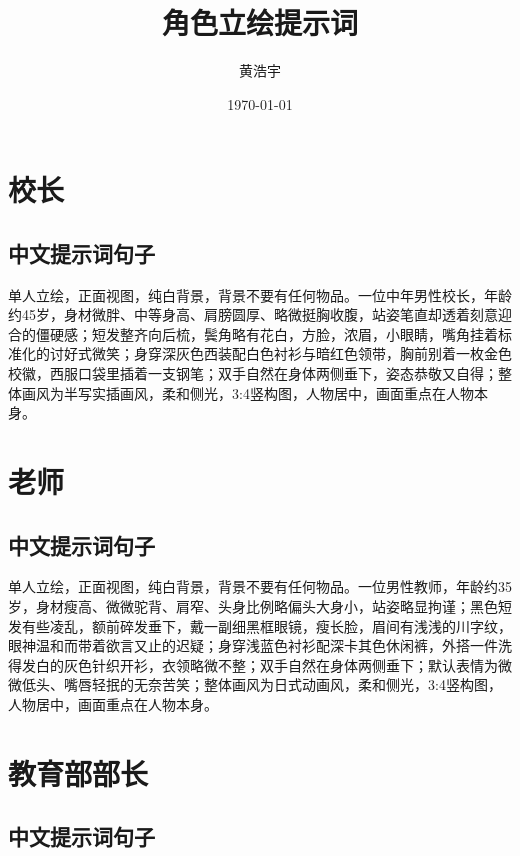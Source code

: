 \documentclass[11pt, a4paper]{article}
\title{角色立绘提示词}
\author{黄浩宇}
\date{\today}
\begin{document}
	
	\maketitle
	\newpage
	
	\tableofcontents
	\newpage
	
	\section{校长}
	
	\subsection{中文提示词句子}
	
	单人立绘，正面视图，纯白背景，背景不要有任何物品。一位中年男性校长，年龄约45岁，身材微胖、中等身高、肩膀圆厚、略微挺胸收腹，站姿笔直却透着刻意迎合的僵硬感；短发整齐向后梳，鬓角略有花白，方脸，浓眉，小眼睛，嘴角挂着标准化的讨好式微笑；身穿深灰色西装配白色衬衫与暗红色领带，胸前别着一枚金色校徽，西服口袋里插着一支钢笔；双手自然在身体两侧垂下，姿态恭敬又自得；整体画风为半写实插画风，柔和侧光，3:4竖构图，人物居中，画面重点在人物本身。
	

	

	
	\section{老师}
	
	\subsection{中文提示词句子}
	
	单人立绘，正面视图，纯白背景，背景不要有任何物品。一位男性教师，年龄约35岁，身材瘦高、微微驼背、肩窄、头身比例略偏头大身小，站姿略显拘谨；黑色短发有些凌乱，额前碎发垂下，戴一副细黑框眼镜，瘦长脸，眉间有浅浅的川字纹，眼神温和而带着欲言又止的迟疑；身穿浅蓝色衬衫配深卡其色休闲裤，外搭一件洗得发白的灰色针织开衫，衣领略微不整；双手自然在身体两侧垂下；默认表情为微微低头、嘴唇轻抿的无奈苦笑；整体画风为日式动画风，柔和侧光，3:4竖构图，人物居中，画面重点在人物本身。
	

	

	
	\section{教育部部长}
	
	\subsection{中文提示词句子}
	
\end{document}
